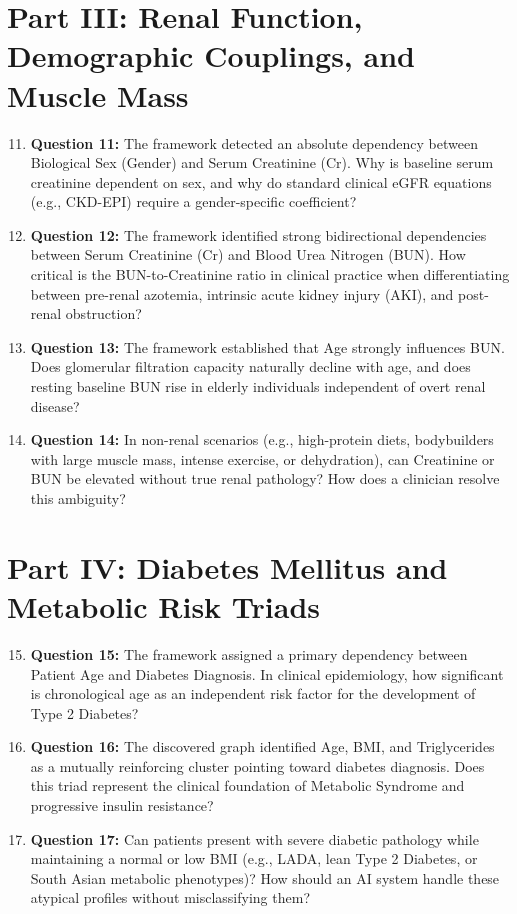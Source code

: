 \documentclass[MTech]{ugthesis}
\begin{document}
\begin{appendices}
\section*{Part III: Renal Function, Demographic Couplings, and Muscle Mass}
\begin{enumerate}\setcounter{enumi}{10}
    \item \textbf{Question 11:} The framework detected an absolute dependency between Biological Sex (Gender) and Serum Creatinine (Cr). Why is baseline serum creatinine dependent on sex, and why do standard clinical eGFR equations (e.g., CKD-EPI) require a gender-specific coefficient?
    \item \textbf{Question 12:} The framework identified strong bidirectional dependencies between Serum Creatinine (Cr) and Blood Urea Nitrogen (BUN). How critical is the BUN-to-Creatinine ratio in clinical practice when differentiating between pre-renal azotemia, intrinsic acute kidney injury (AKI), and post-renal obstruction?
    \item \textbf{Question 13:} The framework established that Age strongly influences BUN. Does glomerular filtration capacity naturally decline with age, and does resting baseline BUN rise in elderly individuals independent of overt renal disease?
    \item \textbf{Question 14:} In non-renal scenarios (e.g., high-protein diets, bodybuilders with large muscle mass, intense exercise, or dehydration), can Creatinine or BUN be elevated without true renal pathology? How does a clinician resolve this ambiguity?
\end{enumerate}

\section*{Part IV: Diabetes Mellitus and Metabolic Risk Triads}
\begin{enumerate}\setcounter{enumi}{14}
    \item \textbf{Question 15:} The framework assigned a primary dependency between Patient Age and Diabetes Diagnosis. In clinical epidemiology, how significant is chronological age as an independent risk factor for the development of Type 2 Diabetes?
    \item \textbf{Question 16:} The discovered graph identified Age, BMI, and Triglycerides as a mutually reinforcing cluster pointing toward diabetes diagnosis. Does this triad represent the clinical foundation of Metabolic Syndrome and progressive insulin resistance?
    \item \textbf{Question 17:} Can patients present with severe diabetic pathology while maintaining a normal or low BMI (e.g., LADA, lean Type 2 Diabetes, or South Asian metabolic phenotypes)? How should an AI system handle these atypical profiles without misclassifying them?
\end{enumerate}


\end{appendices}
\end{document}

